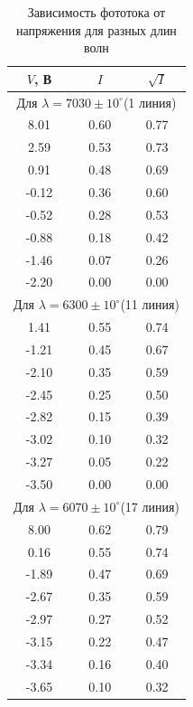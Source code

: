 \documentclass[12pt]{kiarticle} %
\begin{document}
\begin{table}[h!]
    \caption{Зависимость фототока от напряжения для разных длин волн}
    \begin{center}
        \begin{tabular}{|c|c|c|}
            \hline
            $ V $, В & $ I $ & $ \sqrt{I}  $ \\
            \hline
            \multicolumn{3}{|c|}{Для $ \lambda = 7030\pm10^\circ $(1 линия)} \\
            \hline
            8.01 & 0.60 & 0.77 \\
            2.59 & 0.53 & 0.73 \\
            0.91 & 0.48 & 0.69 \\
            -0.12 & 0.36 & 0.60 \\
            -0.52 & 0.28 & 0.53 \\
            -0.88 & 0.18 & 0.42 \\
            -1.46 & 0.07 & 0.26 \\
            -2.20 & 0.00 & 0.00 \\
            \hline 
            \multicolumn{3}{|c|}{Для $ \lambda = 6300\pm10^\circ $(11 линия)} \\
            \hline
            1.41 & 0.55 & 0.74 \\
            -1.21 & 0.45 & 0.67 \\
            -2.10 & 0.35 & 0.59 \\
            -2.45 & 0.25 & 0.50 \\
            -2.82 & 0.15 & 0.39 \\
            -3.02 & 0.10 & 0.32 \\
            -3.27 & 0.05 & 0.22 \\
            -3.50 & 0.00 & 0.00 \\
            \hline 
            \multicolumn{3}{|c|}{Для $ \lambda = 6070\pm10^\circ $(17 линия)} \\
            \hline
            8.00 & 0.62 & 0.79 \\
            0.16 & 0.55 & 0.74 \\
            -1.89 & 0.47 & 0.69 \\
            -2.67 & 0.35 & 0.59 \\
            -2.97 & 0.27 & 0.52 \\
            -3.15 & 0.22 & 0.47 \\
            -3.34 & 0.16 & 0.40 \\
            -3.65 & 0.10 & 0.32 \\

\end{tabular}
\end{center}
\end{table}
\end{document}
